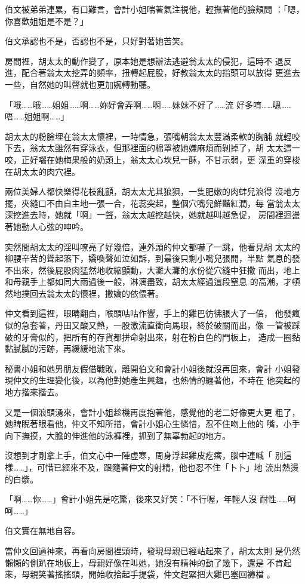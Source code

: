 伯文被弟弟連累，有口難言，會計小姐喘著氣注視他，輕撫著他的臉頰問
：「嗯，你喜歡姐姐是不是？」

伯文承認也不是，否認也不是，只好對著她苦笑。

房間裡，胡太太的動作變了，原本她是想辦法逃避翁太太的侵犯，這時不
退反進，配合著翁太太挖弄的頻率，扭轉起屁股，好教翁太太的指頭可以放得
更進去一些，自然她的叫聲就也更加婉轉動聽。

「哦……哦……姐姐……啊……妳好會弄啊……啊……妹妹不好了……流
好多唷……嗯……唔……姐姐啊……」

胡太太的粉臉埋在翁太太懷裡，一時情急，張嘴朝翁太太豐滿柔軟的胸脯
就輕咬下去，翁太太雖然有穿泳衣，但那裡面的棉罩被她嫌麻煩而剝掉了，胡
太太這一咬，正好囓在她梅果般的奶頭上，翁太太心坎兒一酥，不甘示弱，更
深重的穿梭在胡太太的肉穴裡。

兩位美婦人都快樂得花枝亂顫，胡太太尤其狼狽，一隻肥嫩的肉蚌兒浪得
沒地方擺，夾縫口不由自主地一張一合，花蕊突起，整個穴嘴兒鮮豔紅潤，每
當翁太太深挖進去時，她就「啊」一聲，翁太太越挖越快，她就越叫越急促，
房間裡迴盪著她動人心弦的呻吟。

突然間胡太太的淫叫嘹亮了好幾倍，連外頭的仲文都嚇了一跳，他看見胡
太太的柳腰辛苦的聳起落下，嬌喚聲如泣如訴，到最後只剩小嘴兒張開，半點
氣息的發不出來，然後屁股肉猛然地收縮顫動，大灘大灘的水份從穴縫中狂撒
而出，地上和母親手上都如同大雨過後一般，淋漓盡致，胡太太經過這段窒息
的高潮，才頓然地撲回去翁太太的懷裡，撒嬌的依偎著。

仲文看到這裡，眼睛翻白，喉頭咕咕作響，手上的雞巴彷彿脹大了一倍，
他發瘋似的急套著，丹田又酸又熱，一股激流直衝向馬眼，終於破關而出，像
一管被踩破的牙膏似的，把所有的存貨都拼命射出來，射在粉白色的門板上，
造成一圈黏黏膩膩的污跡，再緩緩地流下來。

秘書小姐和她男朋友假借戰敗，離開伯文和會計小姐後就沒再回來，會計
小姐發現仲文的生理變化後，以為他對她產生興趣，也熱情的纏著他，不時在
他突起的地方揩來揩去。

又是一個浪頭湧來，會計小姐趁機再度抱著他，感覺他的老二好像更大更
粗了，她睥睨著眼看他，仲文不知所措，會計小姐心生憐惜，忍不住吻上他的
嘴，小手向下撫摸，大膽的伸進他的泳褲裡，抓到了無辜勃起的地方。

沒想到才剛拿上手，伯文心中一陣虛寒，周身浮起雞皮疙瘩，腦中連喊「
別這樣……」，可惜已經來不及，跟隨著仲文的射精，他也忍不住「卜卜」地
流出熱燙的白漿。

「啊……你……」會計小姐先是吃驚，後來又好笑：「不行喔，年輕人沒
耐性……呵呵……」

伯文實在無地自容。

當仲文回過神來，再看向房間裡頭時，發現母親已經站起來了，胡太太則
是仍然懶懶的側趴在地板上，母親好像在叫她，她沒有精神的動了幾下，還是
不肯起來，母親笑著搖搖頭，開始收拾起手提袋，仲文趕緊把大雞巴塞回褲襠
。


